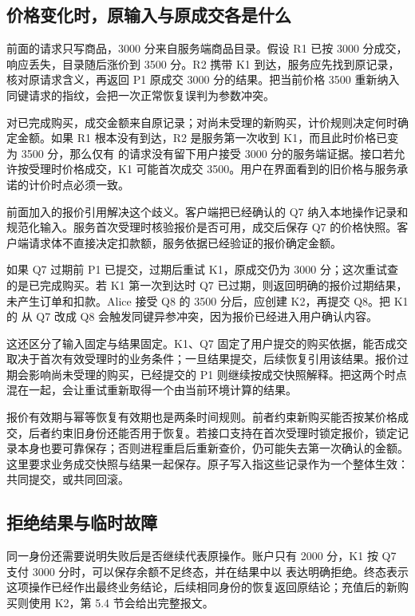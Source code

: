 \subsection*{价格变化时，原输入与原成交各是什么}

前面的请求只写商品，3000 分来自服务端商品目录。假设 R1 已按 3000 分成交，响应丢失，目录随后涨价到 3500 分。R2 携带 K1 到达，服务应先找到原记录，核对原请求含义，再返回 P1 原成交 3000 分的结果。把当前价格 3500 重新纳入同键请求的指纹，会把一次正常恢复误判为参数冲突。

对已完成购买，成交金额来自原记录；对尚未受理的新购买，计价规则决定何时确定金额。如果 R1 根本没有到达，R2 是服务第一次收到 K1，而且此时价格已变为 3500 分，那么仅有  的请求没有留下用户接受 3000 分的服务端证据。接口若允许按受理时价格成交，K1 可能首次成交 3500。用户在界面看到的旧价格与服务承诺的计价时点必须一致。

前面加入的报价引用解决这个歧义。客户端把已经确认的 Q7 纳入本地操作记录和规范化输入。服务首次受理时核验报价是否可用，成交后保存 Q7 的价格快照。客户端请求体不直接决定扣款额，服务依据已经验证的报价确定金额。



如果 Q7 过期前 P1 已提交，过期后重试 K1，原成交仍为 3000 分；这次重试查的是已完成购买。若 K1 第一次到达时 Q7 已过期，则返回明确的报价过期结果，未产生订单和扣款。Alice 接受 Q8 的 3500 分后，应创建 K2，再提交 Q8。把 K1 的  从 Q7 改成 Q8 会触发同键异参冲突，因为报价已经进入用户确认内容。

这还区分了输入固定与结果固定。K1、Q7 固定了用户提交的购买依据，能否成交取决于首次有效受理时的业务条件；一旦结果提交，后续恢复引用该结果。报价过期会影响尚未受理的购买，已经提交的 P1 则继续按成交快照解释。把这两个时点混在一起，会让重试重新取得一个由当前环境计算的结果。

报价有效期与幂等恢复有效期也是两条时间规则。前者约束新购买能否按某价格成交，后者约束旧身份还能否用于恢复。若接口支持在首次受理时锁定报价，锁定记录本身也要可靠保存；否则进程重启后重新查价，仍可能失去第一次确认的金额。这里要求业务成交快照与结果一起保存。原子写入指这些记录作为一个整体生效：共同提交，或共同回滚。

\subsection*{拒绝结果与临时故障}

同一身份还需要说明失败后是否继续代表原操作。账户只有 2000 分，K1 按 Q7 支付 3000 分时，可以保存余额不足终态，并在结果中以  表达明确拒绝。终态表示这项操作已经作出最终业务结论，后续相同身份的恢复返回原结论；充值后的新购买则使用 K2，第 5.4 节会给出完整报文。

